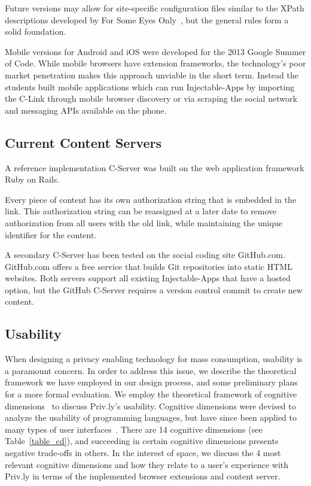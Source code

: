 \documentclass[letterpaper,twocolumn,10pt]{article}
\begin{document}
Future versions may allow for site-specific configuration files similar to the 
XPath descriptions developed by For Some Eyes 
Only~\cite{F.BeatoI.IonS.CapkunM.Langheinrich2013}, but the general rules form a 
solid foundation.

Mobile versions for Android and iOS were developed for the 2013 Google Summer of Code.
While mobile browsers have extension frameworks, the technology's poor market penetration
makes this approach unviable in the short term. Instead the students built mobile
applications which can run Injectable-Apps by importing the C-Link through
mobile browser discovery or via scraping the social network
and messaging APIs available on the phone.

\subsection{Current Content Servers} 
\label{sec:privly_implementation_content_servers}

A reference implementation C-Server was built on the web 
application framework Ruby on Rails. 

Every piece of content has its own authorization string that is embedded in the 
link. This authorization string can be reassigned at a later date to remove 
authorization from all users with the old link, while maintaining the unique 
identifier for the content.

A secondary C-Server has been tested on the social coding site GitHub.com. 
GitHub.com offers a free service that builds Git repositories into static HTML 
websites. Both servers support all existing Injectable-Apps that have a hosted option, but the 
GitHub C-Server requires a version control commit to create new content.

\subsection{Usability} \label{sec:privly_implementation_usability}

When designing a privacy enabling technology for mass consumption, usability 
is a paramount concern. In order to address this issue, we describe the 
theoretical framework we have employed in our design process, and some preliminary 
plans for a more formal evaluation. We employ the theoretical framework of 
cognitive dimensions~\cite{green_1996} to discuss Priv.ly's usability. Cognitive 
dimensions were devised to analyze the usability of programming languages, but 
have since been applied to many types of user interfaces~\cite{green_2006}. There 
are 14 cognitive dimensions (see Table~\ref{table_cd}), and succeeding in certain 
cognitive dimensions presents negative trade-offs in others. In the interest of space, 
we discuss the 4 most relevant cognitive dimensions and how they relate to a 
user's experience with Priv.ly in terms of the implemented browser extensions and 
content server.
\end{document}
